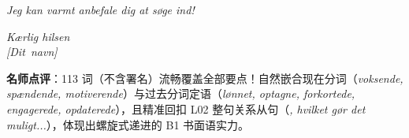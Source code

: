 \begin{answerbox}
\textit{Jeg kan varmt anbefale dig at søge ind!}

\textit{Kærlig hilsen\\
\mbox{[Dit navn]}}

\small\textbf{名师点评}：113 词（不含署名）流畅覆盖全部要点！自然嵌合现在分词（\textit{voksende, spændende, motiverende}）与过去分词定语（\textit{lønnet, optagne, forkortede, engagerede, opdaterede}），且精准回扣 L02 整句关系从句（\textit{, hvilket gør det muligt...}），体现出螺旋式递进的 B1 书面语实力。
\end{answerbox}

